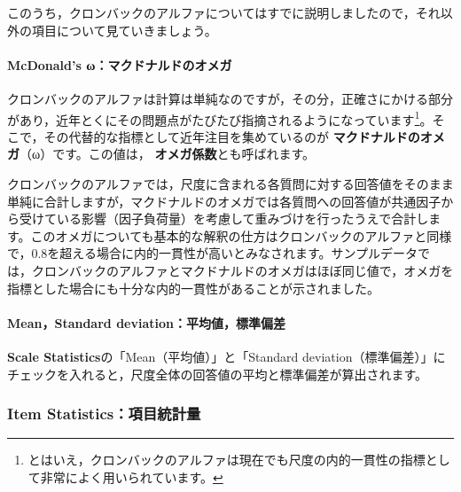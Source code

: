 \documentclass[
  12pt,
  a5jpaper,
  lualatex, ja=standard]{bxjsbook}
\renewcommand{\emph}[1]{\textbf{\color{emph} #1}}
\begin{document}
このうち，クロンバックのアルファについてはすでに説明しましたので，それ以外の項目について見ていきましょう。

\hypertarget{mcdonalds-ux3c9ux30deux30afux30c9ux30caux30ebux30c9ux306eux30aaux30e1ux30ac}{%
\paragraph*{McDonald's ω：マクドナルドのオメガ}\label{mcdonalds-ux3c9ux30deux30afux30c9ux30caux30ebux30c9ux306eux30aaux30e1ux30ac}}

クロンバックのアルファは計算は単純なのですが，その分，正確さにかける部分があり，近年とくにその問題点がたびたび指摘されるようになっています\footnote{とはいえ，クロンバックのアルファは現在でも尺度の内的一貫性の指標として非常によく用いられています。}。そこで，その代替的な指標として近年注目を集めているのが\emph{マクドナルドのオメガ}（ω）です。この値は，\emph{オメガ係数}とも呼ばれます。

クロンバックのアルファでは，尺度に含まれる各質問に対する回答値をそのまま単純に合計しますが，マクドナルドのオメガでは各質問への回答値が共通因子から受けている影響（因子負荷量）を考慮して重みづけを行ったうえで合計します。このオメガについても基本的な解釈の仕方はクロンバックのアルファと同様で，0.8を超える場合に内的一貫性が高いとみなされます。サンプルデータでは，クロンバックのアルファとマクドナルドのオメガはほぼ同じ値で，オメガを指標とした場合にも十分な内的一貫性があることが示されました。

\hypertarget{meanstandard-deviationux5e73ux5747ux5024ux6a19ux6e96ux504fux5dee}{%
\paragraph*{Mean，Standard deviation：平均値，標準偏差}\label{meanstandard-deviationux5e73ux5747ux5024ux6a19ux6e96ux504fux5dee}}

\textbf{Scale Statistics}の「Mean（平均値）」と「Standard deviation（標準偏差）」にチェックを入れると，尺度全体の回答値の平均と標準偏差が算出されます。

\hypertarget{subsub:factor-reliability-item-statistics}{%
\subsubsection*{Item Statistics：項目統計量}\label{subsub:factor-reliability-item-statistics}}
\end{document}
